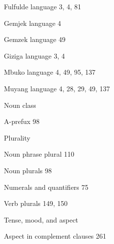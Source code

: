 \begin{multicols}{2}
\begin{styleindexi}
Fulfulde language  3, 4, 81
\end{styleindexi}

\begin{styleindexi}
Gemjek language  4
\end{styleindexi}

\begin{styleindexi}
Gemzek language  49
\end{styleindexi}

\begin{styleindexi}
Giziga language  3, 4
\end{styleindexi}

\begin{styleindexi}
Mbuko language  4, 49, 95, 137
\end{styleindexi}

\begin{styleindexi}
Muyang language  4, 28, 29, 49, 137
\end{styleindexi}

\begin{styleindexi}
Noun class
\end{styleindexi}

\begin{styleindexii}
A-prefux  98
\end{styleindexii}

\begin{styleindexi}
Plurality
\end{styleindexi}

\begin{styleindexii}
Noun phrase plural  110
\end{styleindexii}

\begin{styleindexii}
Noun plurals  98
\end{styleindexii}

\begin{styleindexii}
Numerals and quantifiers  75
\end{styleindexii}

\begin{styleindexii}
Verb plurals  149, 150
\end{styleindexii}

\begin{styleindexi}
Tense, mood, and aspect
\end{styleindexi}

\begin{styleindexii}
Aspect in complement clauses  261
\end{styleindexii}


\end{multicols}
